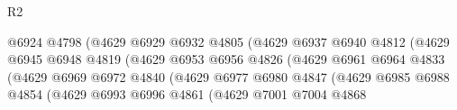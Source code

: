 \begin{lexlean}{R2}
\begin{coremodule}
                                              @6924
                                              @4798
                                              (@4629
                                                @6929
                                                @6932
                                                @4805
                                                (@4629
                                                  @6937
                                                  @6940
                                                  @4812
                                                  (@4629
                                                    @6945
                                                    @6948
                                                    @4819
                                                    (@4629
                                                      @6953
                                                      @6956
                                                      @4826
                                                      (@4629
                                                        @6961
                                                        @6964
                                                        @4833
                                                        (@4629
                                                          @6969
                                                          @6972
                                                          @4840
                                                          (@4629
                                                            @6977
                                                            @6980
                                                            @4847
                                                            (@4629
                                                              @6985
                                                              @6988
                                                              @4854
                                                              (@4629
                                                                @6993
                                                                @6996
                                                                @4861
                                                                (@4629
                                                                  @7001
                                                                  @7004
                                                                  @4868

\end{coremodule}
\end{lexlean}
